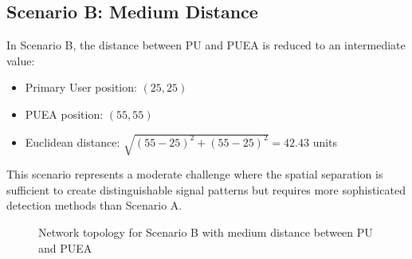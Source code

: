 \subsection{Scenario B: Medium Distance}

In Scenario B, the distance between PU and PUEA is reduced to an intermediate value:
\begin{itemize}
    \item Primary User position: $(25, 25)$
    \item PUEA position: $(55, 55)$
    \item Euclidean distance: $\sqrt{(55-25)^2 + (55-25)^2} = 42.43$ units
\end{itemize}

This scenario represents a moderate challenge where the spatial separation is sufficient to create distinguishable signal patterns but requires more sophisticated detection methods than Scenario A.

\begin{figure}[htbp]
    \centering
    \caption{Network topology for Scenario B with medium distance between PU and PUEA}
    \label{fig:scenario_b}
\end{figure}

